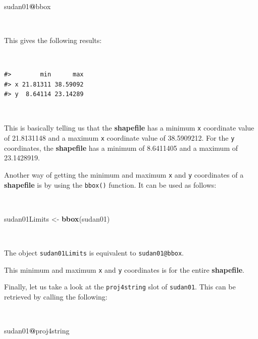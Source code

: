\documentclass[12pt,a4paper,a4paper]{book}
\newenvironment{Shaded}{\begin{snugshade}}{\end{snugshade}}
\newcommand{\KeywordTok}[1]{\textcolor[rgb]{0.13,0.29,0.53}{\textbf{#1}}}
\newcommand{\StringTok}[1]{\textcolor[rgb]{0.31,0.60,0.02}{#1}}
\newcommand{\OperatorTok}[1]{\textcolor[rgb]{0.81,0.36,0.00}{\textbf{#1}}}
\newcommand{\NormalTok}[1]{#1}
\theoremstyle{definition}
\theoremstyle{definition}
\theoremstyle{definition}
\theoremstyle{remark}
\begin{document}
~

\begin{Shaded}
\begin{Highlighting}[]
\NormalTok{sudan01}\OperatorTok{@}\NormalTok{bbox}
\end{Highlighting}
\end{Shaded}

~

This gives the following results:

~

\begin{verbatim}
#>        min      max
#> x 21.81311 38.59092
#> y  8.64114 23.14289
\end{verbatim}

~

This is basically telling us that the \textbf{shapefile} has a minimum
\texttt{x} coordinate value of 21.8131148 and a maximum \texttt{x}
coordinate value of 38.5909212. For the \texttt{y} coordinates, the
\textbf{shapefile} has a minimum of 8.6411405 and a maximum of
23.1428919.

Another way of getting the minimum and maximum \texttt{x} and \texttt{y}
coordinates of a \textbf{shapefile} is by using the \texttt{bbox()}
function. It can be used as follows:

~

\begin{Shaded}
\begin{Highlighting}[]
\NormalTok{sudan01Limits <-}\StringTok{ }\KeywordTok{bbox}\NormalTok{(sudan01)}
\end{Highlighting}
\end{Shaded}

~

The object \texttt{sudan01Limits} is equivalent to
\texttt{sudan01@bbox}.

This minimum and maximum \texttt{x} and \texttt{y} coordinates is for
the entire \textbf{shapefile}.

Finally, let us take a look at the \texttt{proj4string} slot of
\texttt{sudan01}. This can be retrieved by calling the following:

~

\begin{Shaded}
\begin{Highlighting}[]
\NormalTok{sudan01}\OperatorTok{@}\NormalTok{proj4string}
\end{Highlighting}
\end{Shaded}

~
\end{document}
